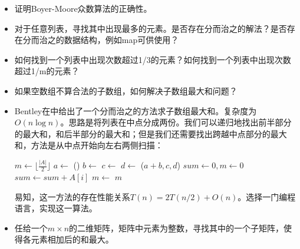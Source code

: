\documentclass[UTF8]{article}
\begin{document}
\begin{Exercise}
\begin{itemize}
\item 证明Boyer-Moore众数算法的正确性。
\item 对于任意列表，寻找其中出现最多的元素。是否存在分而治之的解法？是否存在分而治之的数据结构，例如map可供使用？
\item 如何找到一个列表中出现次数超过1/3的元素？如何找到一个列表中出现次数超过1/m的元素？
\item 如果空数组不算合法的子数组，如何解决子数组最大和问题？
\item Bentley在\cite{programming-pearls}中给出了一个分而治之的方法求子数组最大和。复杂度为$O(n \log n)$。思路是将列表在中点分成两份。我们可以递归地找出前半部分的最大和，和后半部分的最大和；但是我们还需要找出跨越中点部分的最大和，方法是从中点开始向左右两侧扫描：
\begin{algorithmic}[1]
    \State {}
    \State \Return {}
  \Else
    \State $m \gets \lfloor \frac{|A|}{2} \rfloor$
    \State $a \gets$ ()
    \State $b \gets$ 
    \State $c \gets$ 
    \State $d \gets$ \Call{Max-Sum}{$A[m+1...|A|$}
    \State \Return {}($a+b, c, d$)
  \EndIf
\EndFunction
\Statex
{}
  \State $sum \gets 0, m \gets 0$
    \State $sum \gets sum + A[i]$
    \State $m \gets $ 
  \EndFor
  \State \Return $m$
\EndFunction
\end{algorithmic}
易知，这一方法的存在性能关系$T(n) = 2T(n/2) + O(n)$。选择一门编程语言，实现这一算法。
\item 任给一个$m \times n$的二维矩阵，矩阵中元素为整数，寻找其中的一个子矩阵，使得各元素相加后的和最大。

\end{itemize}
\end{Exercise}
\end{document}

